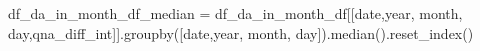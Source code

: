 \documentclass[
  letterpaper,
  DIV=11,
  numbers=noendperiod]{scrartcl}
\newenvironment{Shaded}{\begin{snugshade}}{\end{snugshade}}
\newcommand{\NormalTok}[1]{\textcolor[rgb]{0.00,0.23,0.31}{#1}}
\newcommand{\OperatorTok}[1]{\textcolor[rgb]{0.37,0.37,0.37}{#1}}
\newcommand{\StringTok}[1]{\textcolor[rgb]{0.13,0.47,0.30}{#1}}
\begin{document}
\begin{Shaded}
\begin{Highlighting}[]
\NormalTok{df\_da\_in\_month\_df\_median }\OperatorTok{=}\NormalTok{ df\_da\_in\_month\_df[[}\StringTok{\textquotesingle{}date\textquotesingle{}}\NormalTok{,}\StringTok{\textquotesingle{}year\textquotesingle{}}\NormalTok{, }\StringTok{\textquotesingle{}month\textquotesingle{}}\NormalTok{, }\StringTok{\textquotesingle{}day\textquotesingle{}}\NormalTok{,}\StringTok{\textquotesingle{}qna\_diff\_int\textquotesingle{}}\NormalTok{]].groupby([}\StringTok{\textquotesingle{}date\textquotesingle{}}\NormalTok{,}\StringTok{\textquotesingle{}year\textquotesingle{}}\NormalTok{, }\StringTok{\textquotesingle{}month\textquotesingle{}}\NormalTok{, }\StringTok{\textquotesingle{}day\textquotesingle{}}\NormalTok{]).median().reset\_index()}
\end{Highlighting}
\end{Shaded}
\end{document}
